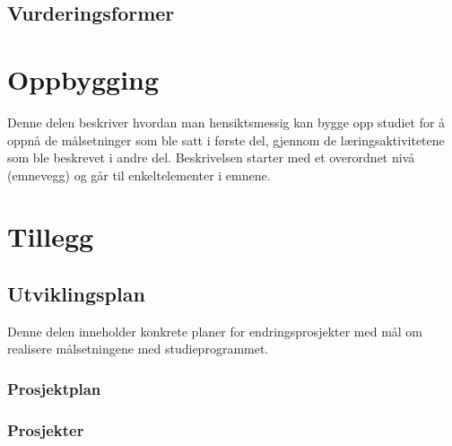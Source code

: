 \documentclass[a4paper, oneside, 12pt]{memoir}
\begin{document}
	\chapter{Vurderingsformer}

\part{Oppbygging}

Denne delen beskriver hvordan man hensiktsmessig kan bygge opp studiet for å oppnå de målsetninger som ble satt i første del, gjennom de læringsaktivitetene som ble beskrevet i andre del. Beskrivelsen starter med et overordnet nivå (emnevegg) og går til enkeltelementer i emnene.

\appendix

\renewcommand{\appendixtocname}{Tillegg}
\renewcommand{\appendixpagename}{Tillegg}
\part*{Tillegg}

\chapter{Utviklingsplan}

Denne delen inneholder konkrete planer for endringsprosjekter med mål om realisere målsetningene med studieprogrammet.

\section{Prosjektplan}

	

\section{Prosjekter}
	
	
	



\end{document}
